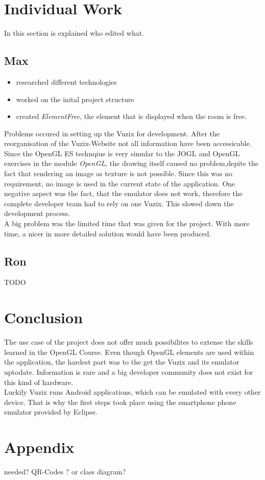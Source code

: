 \documentclass[11pt]{scrartcl}
\begin{document}
\begin{multicols}{2}
	\section{Individual Work}
		In this section is explained who edited what.
		\subsection{Max}
			\begin{itemize}
				\item researched different technologies
				\item worked on the inital project structure
				\item created \emph{ElementFree}, the element that is displayed when the room is free.
			\end{itemize}
			 Problems occured in setting up the Vuzix for development. After the reorganisation of the Vuzix-Website not all information have been accessicable. \\
			 Since the OpenGL ES technqiue is very simular to the JOGL and OpenGL exercises in the module \emph{OpenGL}, the drawing itself caused no problem,depite the fact that rendering an image as texture is not possible. Since this was no requirement, no image is used in the current state of the application.  One negative aspect was the fact, that the emulator does not work, therefore the complete developer team had to rely on one Vuzix. This slowed down the development process.\\
			 A big problem was the limited time that was given for the project.  With more time, a nicer in more detailed solution would have been produced.
		\subsection{Ron}
			TODO
			
	\section{Conclusion}
		The use case of the project does not offer much possibilites to extense the skills learned in the OpenGL Course. Even \linebreak though OpenGL elements are used within the application, the hardest part was to the get the Vuzix and its emulator uptodate. Information is rare and a big developer community does not exist for this kind of hardware. \\
		Luckily Vuzix runs Android applications, which can be emulated with every other device. That is why the first steps took place using the smartphone phone emulator provided by Eclipse. \\
\end{multicols}

\section*{Appendix}
needed? QR-Codes ? or class diagram?
\end{document}
